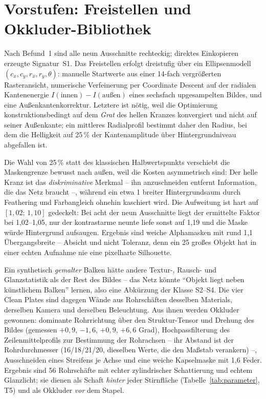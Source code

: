 \section{Vorstufen: Freistellen und Okkluder-Bibliothek}
\label{sec:matting}

 Nach Befund~1 sind alle neun Ausschnitte
rechteckig; direktes Einkopieren erzeugte Signatur~S1. Das Freistellen erfolgt
dreistufig über ein Ellipsenmodell $(c_x, c_y, r_x, r_y, \theta)$: manuelle
Startwerte aus einer 14-fach vergrößerten Rasteransicht, numerische Verfeinerung
per Coordinate Descent auf der radialen Kantenenergie
$I(\text{innen}) - I(\text{außen})$ eines sechsfach upgesampelten Bildes, und
eine Außenkantenkorrektur. Letztere ist nötig, weil die Optimierung
konstruktionsbedingt auf dem \emph{Grat} des hellen Kranzes konvergiert und nicht
auf seiner Außenkante; ein mittleres Radialprofil bestimmt daher den Radius, bei
dem die Helligkeit auf 25\,\% der Kantenamplitude über Hintergrundniveau
abgefallen ist.

Die Wahl von 25\,\% statt des klassischen Halbwertspunkts
\parencite{gonzalez2018} verschiebt die Maskengrenze bewusst nach außen, weil die
Kosten asymmetrisch sind: Der helle Kranz ist das \emph{diskriminative} Merkmal
-- ihn anzuschneiden entfernt Information, die das Netz braucht --, während ein
etwa 1\px{} breiter Hintergrundsaum durch Feathering und Farbangleich ohnehin
kaschiert wird. Die Aufweitung ist hart auf $[1{,}02;\,1{,}10]$ gedeckelt: Bei
acht der neun Ausschnitte liegt der ermittelte Faktor bei 1,02--1,05, nur der
kontrastarme neunte liefe sonst auf 1,19 und die Maske würde Hintergrund
aufsaugen. Ergebnis sind weiche Alphamasken mit rund 1,1\px{} Übergangsbreite --
Absicht und nicht Toleranz, denn ein 25\px{} großes Objekt hat in einer echten
Aufnahme nie eine pixelharte Silhouette.

 Ein synthetisch \emph{gemalter} Balken hätte andere
Textur-, Rausch- und Glanzstatistik als der Rest des Bildes -- das Netz könnte
\enquote{Objekt liegt neben künstlichem Balken} lernen, also eine Abkürzung der
Klasse S2--S4. Die vier Clean Plates sind dagegen Wände aus Rohrschäften
desselben Materials, derselben Kamera und derselben Beleuchtung. Aus ihnen werden
Okkluder gewonnen: dominante Rohrrichtung über den Struktur-Tensor
\parencite{jaehne2005} und Drehung des Bildes (gemessen $+0{,}9$, $-1{,}6$,
$+0{,}9$, $+6{,}6$ Grad), Hochpassfilterung des Zeilenmittelprofils zur
Bestimmung der Rohrachsen -- ihr Abstand ist der Rohrdurchmesser
(16/18/21/20\px, dieselben Werte, die den Maßstab verankern) --, Ausschneiden
eines Streifens je Achse und eine weiche Kapselmaske mit 1,6\px{} Feder.
Ergebnis sind 56 Rohrschäfte mit echter zylindrischer Schattierung und echtem
Glanzlicht; sie dienen als Schaft \emph{hinter} jeder Stirnfläche
(Tabelle~\ref{tab:parameter}, T5) und als Okkluder \emph{vor} dem Stapel.

